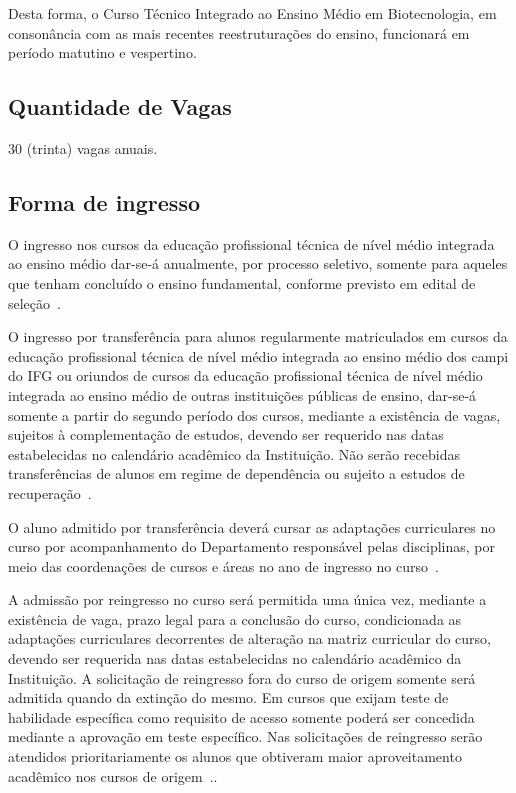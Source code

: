 \documentclass[11pt,fleqn]{book} %
\begin{document}
Desta forma, o Curso Técnico Integrado ao Ensino Médio em Biotecnologia, em consonância com as mais recentes reestruturações do ensino, funcionará em período matutino e vespertino.

\subsection{Quantidade de Vagas}
\indent

30 (trinta) vagas anuais. 


\subsection{Forma de ingresso}

O ingresso nos cursos da educação profissional técnica de nível médio integrada ao ensino médio dar-se-á anualmente, por processo seletivo, somente para aqueles que tenham concluído o ensino fundamental, conforme previsto em edital de seleção~\cite{Resolucao22De2011}.

O ingresso por transferência para alunos regularmente matriculados em cursos da educação profissional técnica de nível médio integrada ao ensino médio dos campi do IFG ou oriundos de cursos da educação profissional técnica de nível médio integrada ao ensino médio de outras instituições públicas de ensino, dar-se-á somente a partir do segundo período dos cursos, mediante a existência de vagas, sujeitos à complementação de estudos, devendo ser requerido nas datas estabelecidas no calendário acadêmico da Instituição.
Não serão recebidas transferências de alunos em regime de dependência ou sujeito a estudos de recuperação~\cite{Resolucao22De2011}.

O aluno admitido por transferência deverá cursar as adaptações curriculares no curso por acompanhamento do Departamento responsável pelas disciplinas, por meio das coordenações de cursos e áreas no ano de ingresso no curso~\cite{Resolucao22De2011}.

A admissão por reingresso no curso será permitida uma única vez, mediante a existência de vaga, prazo legal para a conclusão do curso, condicionada as adaptações curriculares decorrentes de alteração na matriz curricular do curso, devendo ser requerida nas datas estabelecidas no calendário acadêmico da Instituição.
A solicitação de reingresso fora do curso de origem somente será admitida quando da extinção do mesmo.
Em cursos que exijam teste de habilidade específica como requisito de acesso somente poderá ser concedida mediante a aprovação em teste específico.
Nas solicitações de reingresso serão atendidos prioritariamente os alunos que obtiveram maior aproveitamento acadêmico nos cursos de origem~\cite{Resolucao22De2011}..
\end{document}
